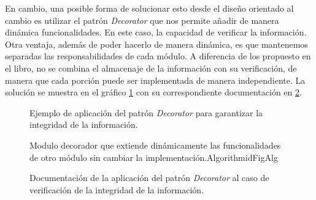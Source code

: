 En cambio, una posible forma de solucionar esto desde el diseño orientado al cambio es utilizar el patrón \textit{Decorator} que nos permite añadir de manera dinámica funcionalidades. En este caso, la capacidad de verificar la información. Otra ventaja, además de poder hacerlo de manera dinámica, es que mantenemos separadas las responsabilidades de cada módulo. A diferencia de los propuesto en el libro, no se combina el almacenaje de la información con su verificación, de manera que cada porción puede ser implementada de manera independiente. La solución se muestra en el gráfico \ref{decorator} con su correspondiente documentación en \ref{docDecorator}.

\begin{figure}[h]
\caption{Ejemplo de aplicación del patrón \textit{Decorator} para garantizar la integridad de la información.}
\label{decorator}
\begin{center}
\end{center}
\end{figure}

\begin{figure}[H]
\caption{Documentación de la aplicación del patrón \textit{Decorator} al caso de verificación de la integridad de la información.}
\label{docDecorator}
\begin{pattern}[]{Modulo decorador que extiende dinámicamente las funcionalidades de otro módulo sin cambiar la implementación.}{Algorithm}{idFigAlg}
\assigns
{}

\end{pattern}
\end{figure}


